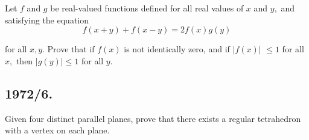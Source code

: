 \documentclass[12pt,thmsa]{article}
\begin{document}
Let $f$ and $g$ be real-valued functions defined for all real values of $x$
and $y,$ and satisfying the equation
\[
f(x+y)+f(x-y)=2f(x)g(y)
\]

for all $x,y.$ Prove that if $f(x)$ is not identically zero, and if  $\left|
f(x)\right| $ $\leq 1$ for all $x,$ then $\left| g(y)\right| \leq 1$ for all 
$y.$

\subsection{1972/6.}

Given four distinct parallel planes, prove that there exists a regular
tetrahedron with a vertex on each plane.
\end{document}
